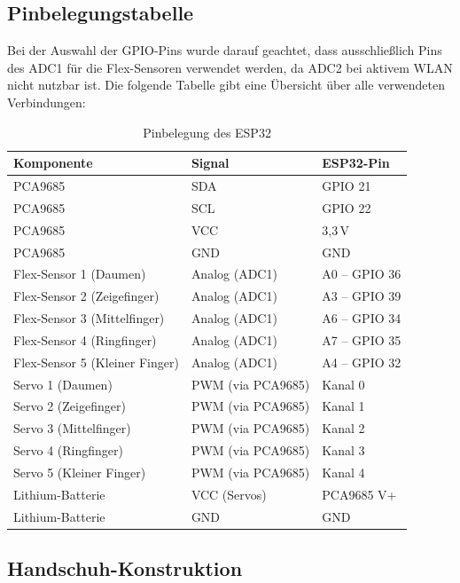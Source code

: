 \documentclass[12pt,a4paper]{article}
\begin{document}
\subsection{Pinbelegungstabelle}

Bei der Auswahl der GPIO-Pins wurde darauf geachtet, dass ausschließlich Pins des ADC1 für die Flex-Sensoren verwendet werden, da ADC2 bei aktivem WLAN nicht nutzbar ist. Die folgende Tabelle gibt eine Übersicht über alle verwendeten Verbindungen:

\begin{table}[H]
\centering
\begin{tabular}{|l|l|l|}
\hline
\textbf{Komponente} & \textbf{Signal} & \textbf{ESP32-Pin} \\
\hline
PCA9685 & SDA & GPIO 21 \\
PCA9685 & SCL & GPIO 22 \\
PCA9685 & VCC & 3{,}3\,V \\
PCA9685 & GND & GND \\
\hline
Flex-Sensor 1 (Daumen)         & Analog (ADC1) & A0 -- GPIO 36 \\
Flex-Sensor 2 (Zeigefinger)    & Analog (ADC1) & A3 -- GPIO 39 \\
Flex-Sensor 3 (Mittelfinger)   & Analog (ADC1) & A6 -- GPIO 34 \\
Flex-Sensor 4 (Ringfinger)     & Analog (ADC1) & A7 -- GPIO 35 \\
Flex-Sensor 5 (Kleiner Finger) & Analog (ADC1) & A4 -- GPIO 32 \\
\hline
Servo 1 (Daumen)         & PWM (via PCA9685) & Kanal 0 \\
Servo 2 (Zeigefinger)    & PWM (via PCA9685) & Kanal 1 \\
Servo 3 (Mittelfinger)   & PWM (via PCA9685) & Kanal 2 \\
Servo 4 (Ringfinger)     & PWM (via PCA9685) & Kanal 3 \\
Servo 5 (Kleiner Finger) & PWM (via PCA9685) & Kanal 4 \\
\hline
Lithium-Batterie & VCC (Servos) & PCA9685 V+ \\
Lithium-Batterie & GND          & GND \\
\hline
\end{tabular}
\caption{Pinbelegung des ESP32}
\end{table}

\subsection{Handschuh-Konstruktion}
\end{document}
